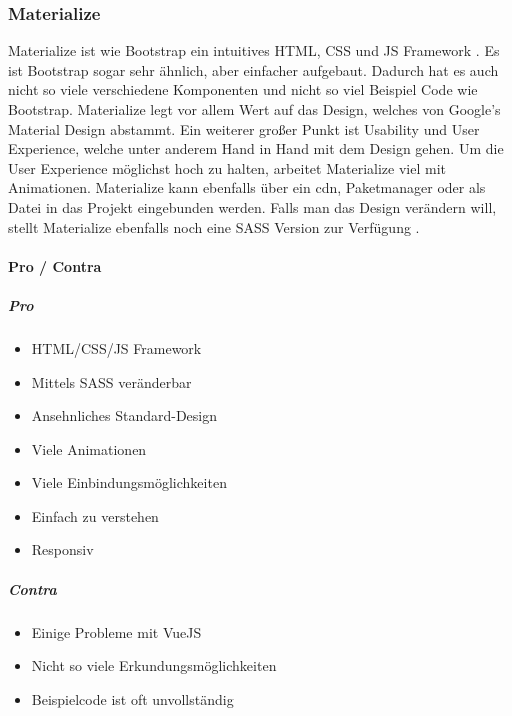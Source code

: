 		\subsubsection{Materialize}
		\label{chapter:study-frontend-frameworks-materialize}
		Materialize ist wie Bootstrap ein intuitives HTML, CSS und JS Framework \cite{materialize-intro}. Es ist Bootstrap sogar sehr ähnlich, aber einfacher aufgebaut. Dadurch hat es auch nicht so viele verschiedene Komponenten und nicht so viel Beispiel Code wie Bootstrap. Materialize legt vor allem Wert auf das Design, welches von Google's Material Design abstammt. Ein weiterer großer Punkt ist Usability und User Experience, welche unter anderem Hand in Hand mit dem Design gehen. Um die User Experience möglichst hoch zu halten, arbeitet Materialize viel mit Animationen. Materialize kann ebenfalls über ein \Gls{cdn}, Paketmanager oder als Datei in das Projekt eingebunden werden. Falls man das Design verändern will, stellt Materialize ebenfalls noch eine SASS Version zur Verfügung \cite{WebDocMaterialize}.
		\paragraph{Pro / Contra}
		\subparagraph{Pro}
		\begin{itemize}
			\item HTML/CSS/JS Framework
			\item Mittels SASS veränderbar
			\item Ansehnliches Standard-Design 
			\item Viele Animationen
			\item Viele Einbindungsmöglichkeiten
			\item Einfach zu verstehen
			\item Responsiv
		\end{itemize}
	\label{list:materializepro}
		\subparagraph{Contra}
		\begin{itemize}
			\item Einige Probleme mit VueJS
			\item Nicht so viele Erkundungsmöglichkeiten
			\item Beispielcode ist oft unvollständig
		\end{itemize}
	\label{list:materializecontra}
	
